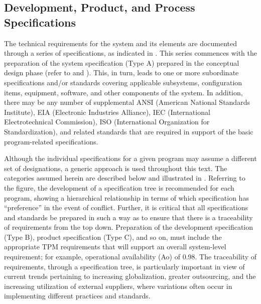 \subsection{Development, Product, and Process Specifications}

The technical requirements for the system and its elements are documented through a series of specifications, as indicated in . This series commences with the preparation of the system specification (Type A) prepared in the conceptual design phase (refer to  and ). This, in turn, leads to one or more subordinate specifications and/or standards covering applicable subsystems, configuration items, equipment, software, and other components of the system. In addition, there may be any number of supplemental ANSI (American National Standards Institute), EIA (Electronic Industries Alliance), IEC (International Electrotechnical Commission), ISO (International Organization for Standardization), and related standards that are required in support of the basic program-related specifications.

Although the individual specifications for a given program may assume a different set of designations, a generic approach is used throughout this text. The categories assumed herein are described below and illustrated in . Referring to the figure, the development of a specification tree is recommended for each program, showing a hierarchical relationship in terms of which specification has ``preference'' in the event of conflict. Further, it is critical that all specifications and standards be prepared in such a way as to ensure that there is a traceability of requirements from the top down. Preparation of the development specification (Type B), product specification (Type C), and so on, must include the appropriate TPM requirements that will support an overall system-level requirement; for example, operational availability (Ao) of 0.98. The traceability of requirements, through a specification tree, is particularly important in view of current trends pertaining to increasing globalization, greater outsourcing, and the increasing utilization of external suppliers, where variations often occur in implementing different practices and standards.

